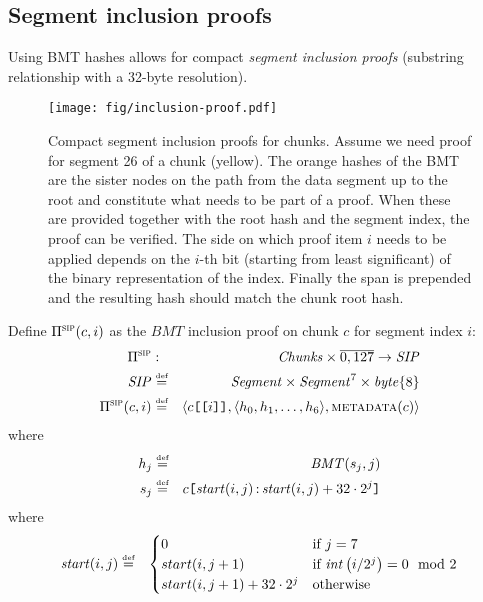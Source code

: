 \subsection{Segment inclusion proofs}

Using BMT hashes allows for compact \emph{segment inclusion proofs} (substring relationship with a 32-byte resolution).

\begin{figure}[!ht]
\centering
\texttt{[image: fig/inclusion-proof.pdf]}
\caption[Compact segment inclusion proofs for chunks ]{Compact segment inclusion proofs for chunks. Assume we need proof for segment 26 of a chunk (yellow). The orange hashes of the BMT are the sister nodes on the path from the data segment up to the root and constitute what needs to be part of a proof. When these are provided together with the root hash and the segment index, the proof can be verified. The side on which proof item $i$ needs to be applied depends on the $i$-th bit (starting from least significant) of the binary representation of the index. Finally the span is prepended and the resulting hash should match the chunk root hash.}
\label{fig:chunk-inclusion}
\end{figure}

\begin{definition}
\label{def:sip}
Define  $\Pi^{\textsc{sip}}(c,i)$ as the $\mathit{BMT}$ inclusion proof on chunk $c$ for segment index $i$:
%
\begin{eqnarray}
\Pi^{\textsc{sip}}&: &\mathit{Chunks}\times \overline{0,127} \to \mathit{SIP}\\
\mathit{SIP}&\overset{\textrm{\tiny def}}{=}&\mathit{Segment}\times\mathit{Segment}^7\times \mathit{byte}\{8\}
\\
\Pi^{\textsc{sip}}(c,i) &\overset{\textrm{\tiny def}}{=} &\langle c\texttt{[}\/\texttt{[}\/i\/\texttt{]}\/\texttt{]},\langle h_0, h_1, \ldots, h_6\rangle, \textsc{metadata}(c)\rangle  
\end{eqnarray}
%
where
%
\begin{eqnarray}
h_j&\overset{\textrm{\tiny def}}{=}& \mathit{BMT}(s_j,j)\\
s_j&\overset{\textrm{\tiny def}}{=}&c\texttt{[}\/\mathit{start}(i,j)\operatorname{:}\mathit{start}(i,j)+32\cdot 2^j\/\texttt{]}
\end{eqnarray}
%
where
%
\begin{eqnarray}
\mathit{start}(i,j)&\overset{\textrm{\tiny def}}{=}&
\begin{cases}
0 &\text{if } j=7\\
start(i,j+1) & \text{if } \mathit{int}\left(i / 2^j\right) = 0 \mod 2\\
start(i,j+1)+32\cdot 2^{j} &\text{otherwise}
\end{cases}
\end{eqnarray}
\end{definition}

